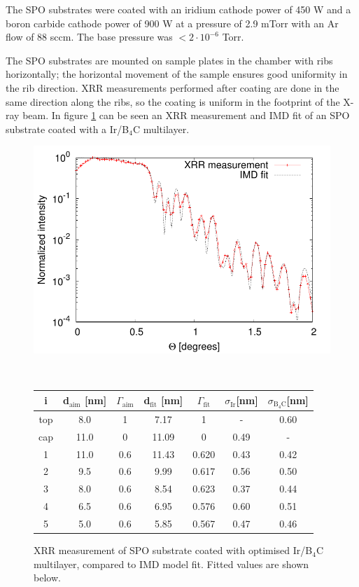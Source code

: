 The SPO substrates were coated with an iridium cathode power of 450 W and a boron carbide cathode power of 900 W at a pressure of 2.9 mTorr with an Ar flow of 88 sccm. The base pressure was $< 2\cdot10^{-6}$ Torr.

The SPO substrates are mounted on sample plates in the chamber with ribs horizontally; the horizontal movement of the sample ensures good uniformity in the rib direction. XRR measurements performed after coating are done in the same direction along the ribs, so the coating is uniform in the footprint of the X-ray beam. In figure \ref{fig:ir-b4c-fit} can be seen an XRR measurement and IMD fit of an SPO substrate coated with a  Ir/B$_4$C multilayer.

\begin{figure}[h!]
\centering
\begin{minipage}{.6\textwidth}
  \centering
  \includegraphics[width=\linewidth]{figures/athena/coating_on_spo/120-10-21_fit.pdf}
\end{minipage}
\\
\vspace{1cm}
\begin{minipage}{.8\textwidth}
  \centering
  \footnotesize
\begin{tabular}{c|c|c|c|c|c|c}
i&d$_{\text{aim}}$ [nm]&$\Gamma_{\text{aim}}$&d$_{\text{fit}}$ [nm]&$\Gamma_{\text{fit}}$&$\sigma_{\text{Ir}}$[nm]&$\sigma_{\text{B}_4\text{C}}$[nm]\\
\hline
top&8.0&1&7.17&1&-&0.60\\
cap&11.0&0&11.09&0&0.49&-\\
1&11.0&0.6&11.43&0.620&0.43&0.42\\
2&9.5&0.6&9.99&0.617&0.56&0.50\\
3&8.0&0.6&8.54&0.623&0.37&0.44\\
4&6.5&0.6&6.95&0.576&0.60&0.51\\
5&5.0&0.6&5.85&0.567&0.47&0.46
\end{tabular}
\end{minipage}
\caption{\footnotesize XRR measurement of SPO substrate coated with optimised Ir/B$_4$C multilayer, compared to IMD model fit. Fitted values are shown below.}\label{fig:ir-b4c-fit}
\end{figure}

